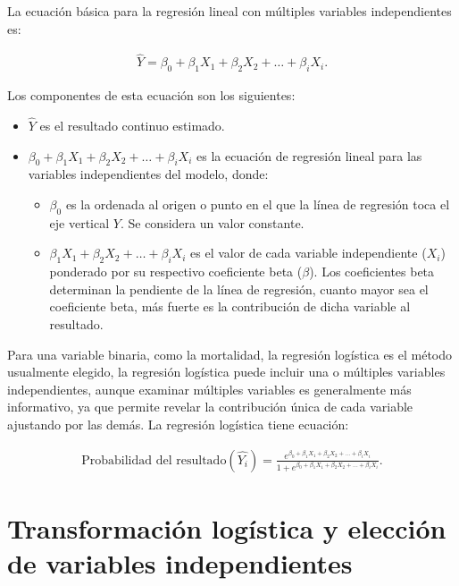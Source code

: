 \documentclass[12pt]{article}
\begin{document}
La ecuaci\'on b\'asica para la regresi\'on lineal con m\'ultiples variables independientes es:

\begin{eqnarray}
\hat{Y} = \beta_0 + \beta_1 X_1 + \beta_2 X_2 + \ldots + \beta_i X_i.
\end{eqnarray}

Los componentes de esta ecuaci\'on son los siguientes:
\begin{itemize}
  \item $\hat{Y}$ es el resultado continuo estimado.
  \item $\beta_0 + \beta_1 X_1 + \beta_2 X_2 + \ldots + \beta_i X_i$ es la ecuaci\'on de regresi\'on lineal para las variables independientes del modelo, donde:
  \begin{itemize}
    \item $\beta_0$ es la ordenada al origen o punto en el que la l\'inea de regresi\'on toca el eje vertical $Y$. Se considera un valor constante.
    \item $\beta_1 X_1 + \beta_2 X_2 + \ldots + \beta_i X_i$ es el valor de cada variable independiente ($X_i$) ponderado por su respectivo coeficiente beta ($\beta$). Los coeficientes beta determinan la pendiente de la l\'inea de regresi\'on, cuanto mayor sea el coeficiente beta, m\'as fuerte es la contribuci\'on de dicha variable al resultado.
  \end{itemize}
\end{itemize}

Para una variable binaria, como la mortalidad, la regresi\'on log\'istica es el m\'etodo usualmente elegido, la regresi\'on log\'istica puede incluir una o m\'ultiples variables independientes, aunque examinar m\'ultiples variables es generalmente m\'as informativo, ya que permite revelar la contribuci\'on \'unica de cada variable ajustando por las dem\'as. La regresi\'on log\'istica tiene ecuaci\'on:

\begin{eqnarray}
\textrm{Probabilidad del resultado}(\hat{Y_i}) = \frac{e^{\beta_0 + \beta_1 X_1 + \beta_2 X_2 + \ldots + \beta_i X_i}}{1 + e^{\beta_0 + \beta_1 X_1 + \beta_2 X_2 + \ldots + \beta_i X_i}}.
\end{eqnarray}


\section{Transformaci\'on log\'istica y elecci\'on de variables independientes}
\end{document}
